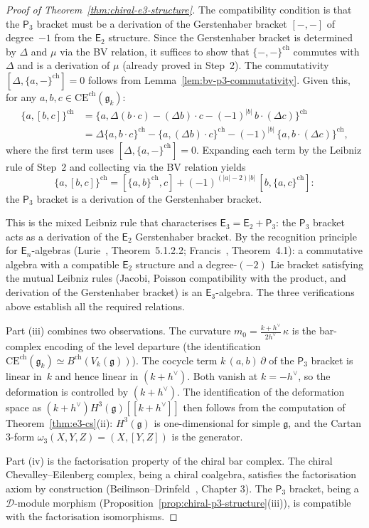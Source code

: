 \documentclass[11pt,reqno]{amsart}
\theoremstyle{definition}
\theoremstyle{remark}
\newcommand{\cD}{\mathcal{D}}
\newcommand{\CE}{\mathrm{CE}}
\newcommand{\Etwo}{\mathsf{E}_{2}}
\newcommand{\Ethree}{\mathsf{E}_{3}}
\newcommand{\Pthree}{\mathsf{P}_{3}}
\newcommand{\fg}{\mathfrak{g}}
\numberwithin{equation}{section}
\begin{document}
\begin{proof}[Proof of Theorem~\ref{thm:chiral-e3-structure}]
The compatibility condition is that the $\Pthree$ bracket
must be a derivation of the Gerstenhaber bracket
$[-,-]$ of degree~$-1$ from the $\Etwo$ structure.
Since the Gerstenhaber bracket is determined by $\Delta$
and $\mu$ via the BV relation, it suffices to show that
$\{-,-\}^{\mathrm{ch}}$ commutes with $\Delta$ and is a
derivation of $\mu$ (already proved in Step~2). The
commutativity $[\Delta, \{a,-\}^{\mathrm{ch}}] = 0$
follows from Lemma~\ref{lem:bv-p3-commutativity}.
Given this, for any $a, b, c \in
\CE^{\mathrm{ch}}(\fg_k)$:
\begin{align*}
  \{a, [b, c]\}^{\mathrm{ch}}
  &= \{a, \Delta(b \cdot c)
  - (\Delta b) \cdot c
  - (-1)^{|b|}\,b \cdot (\Delta c)\}^{\mathrm{ch}} \\
  &= \Delta\{a, b \cdot c\}^{\mathrm{ch}}
  - \{a, (\Delta b) \cdot c\}^{\mathrm{ch}}
  - (-1)^{|b|}\,\{a, b \cdot (\Delta c)\}^{\mathrm{ch}},
\end{align*}
where the first term uses
$[\Delta, \{a,-\}^{\mathrm{ch}}] = 0$. Expanding each
term by the Leibniz rule of Step~2 and collecting via the
BV relation yields
\[
  \{a, [b, c]\}^{\mathrm{ch}}
  = [\{a, b\}^{\mathrm{ch}}, c]
  + (-1)^{(|a|-2)|b|}\,[b, \{a, c\}^{\mathrm{ch}}]:
\]
the $\Pthree$ bracket is a derivation of the
Gerstenhaber bracket.

This is the mixed Leibniz rule that characterises
$\Ethree = \Etwo + \Pthree$: the $\Pthree$ bracket acts
as a derivation of the $\Etwo$ Gerstenhaber bracket. By
the recognition principle for $\mathsf{E}_n$-algebras
(Lurie~\cite{HA}, Theorem~5.1.2.2;
Francis~\cite{Francis2013}, Theorem~4.1): a commutative
algebra with a compatible $\Etwo$ structure and a
degree-$(-2)$ Lie bracket satisfying the mutual Leibniz
rules (Jacobi, Poisson compatibility with the product, and
derivation of the Gerstenhaber bracket) is an
$\Ethree$-algebra. The three verifications above establish
all the required relations.

Part (iii) combines two observations. The curvature
$m_0 = \tfrac{k + h^\vee}{2h^\vee}\,\kappa$ is the bar-complex
encoding of the level departure (the identification
$\CE^{\mathrm{ch}}(\fg_k) \simeq B^{\mathrm{ch}}(V_k(\fg))$).
The cocycle term
$k\,(a,b)\,\partial$ of the $\Pthree$ bracket is linear
in~$k$ and hence linear in $(k + h^\vee)$.
Both vanish at $k = -h^\vee$, so the
deformation is controlled by $(k + h^\vee)$. The identification
of the deformation space as $(k+h^\vee) H^3(\fg)[[k+h^\vee]]$
then follows from the computation of
Theorem~\ref{thm:e3-cs}(ii): $H^3(\fg)$ is one-dimensional
for simple $\fg$, and the Cartan $3$-form
$\omega_3(X, Y, Z) = (X, [Y,Z])$ is the generator.

Part (iv) is the factorisation property of the chiral
bar complex. The chiral Chevalley--Eilenberg complex, being
a chiral coalgebra, satisfies the factorisation axiom
by construction (Beilinson--Drinfeld~\cite{BD04}, Chapter 3).
The $\Pthree$ bracket, being a $\cD$-module morphism
(Proposition~\ref{prop:chiral-p3-structure}(iii)), is
compatible with the factorisation isomorphisms.
\end{proof}
\end{document}
